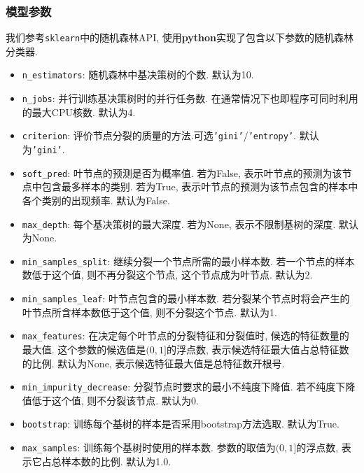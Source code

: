 \documentclass[a4paper]{article}
\begin{document}
\subsubsection{模型参数}
我们参考\texttt{sklearn}中的随机森林API\cite{sklearn}, 使用\textbf{python}实现了包含以下参数的随机森林分类器.
\begin{itemize}
    \item \texttt{n\_estimators}: 随机森林中基决策树的个数. 默认为10. 
    \item \texttt{n\_jobs}: 并行训练基决策树时的并行任务数. 在通常情况下也即程序可同时利用的最大CPU核数. 默认为4. 
    \item \texttt{criterion}: 评价节点分裂的质量的方法.可选\texttt{'gini'}/\texttt{'entropy'}. 默认为\texttt{'gini'}.
    \item \texttt{soft\_pred}: 叶节点的预测是否为概率值. 若为False, 表示叶节点的预测为该节点中包含最多样本的类别. 若为True, 表示叶节点的预测为该节点包含的样本中各个类别的出现频率. 默认为False. 
    \item \texttt{max\_depth}: 每个基决策树的最大深度. 若为None, 表示不限制基树的深度. 默认为None.
    \item \texttt{min\_samples\_split}: 继续分裂一个节点所需的最小样本数. 若一个节点的样本数低于这个值, 则不再分裂这个节点, 这个节点成为叶节点. 默认为2.
    \item \texttt{min\_samples\_leaf}: 叶节点包含的最小样本数. 若分裂某个节点时将会产生的叶节点所含样本数低于这个值, 则不分裂这个节点. 默认为1.
    \item \texttt{max\_features}: 在决定每个叶节点的分裂特征和分裂值时, 候选的特征数量的最大值. 这个参数的候选值是$(0,1]$的浮点数, 表示候选特征最大值占总特征数的比例. 默认为None, 表示候选特征最大值是总特征数开根号.
    \item \texttt{min\_impurity\_decrease}: 分裂节点时要求的最小不纯度下降值. 若不纯度下降值低于这个值, 则不分裂该节点. 默认为0.
    \item \texttt{bootstrap}: 训练每个基树的样本是否采用bootstrap方法选取. 默认为True.
    \item \texttt{max\_samples}: 训练每个基树时使用的样本数. 参数的取值为$(0,1]$的浮点数, 表示它占总样本数的比例. 默认为1.0.
\end{itemize}
\end{document}
